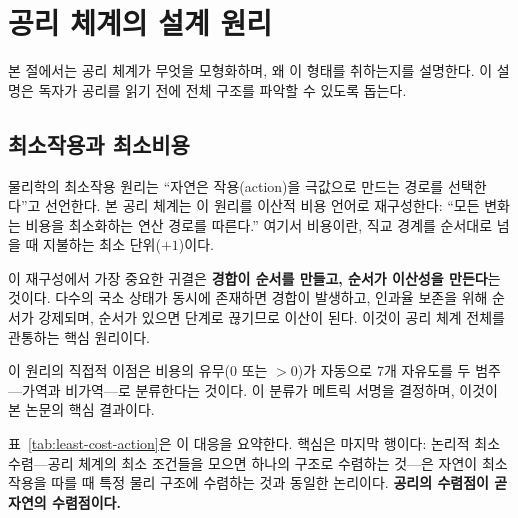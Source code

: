 \documentclass[entropy,article,submit,pdftex,oneauthor]{Definitions/mdpi}
\begin{document}
\section{공리 체계의 설계 원리}
\label{sec:framework}

본 절에서는 공리 체계가 무엇을 모형화하며, 왜 이 형태를 취하는지를 설명한다. 이 설명은 독자가 공리를 읽기 전에 전체 구조를 파악할 수 있도록 돕는다.

\subsection{최소작용과 최소비용}

물리학의 최소작용 원리는 ``자연은 작용(action)을 극값으로 만드는 경로를 선택한다''고 선언한다. 본 공리 체계는 이 원리를 이산적 비용 언어로 재구성한다: ``모든 변화는 비용을 최소화하는 연산 경로를 따른다.'' 여기서 비용이란, 직교 경계를 순서대로 넘을 때 지불하는 최소 단위($+1$)이다.

이 재구성에서 가장 중요한 귀결은 \textbf{경합이 순서를 만들고, 순서가 이산성을 만든다}는 것이다. 다수의 국소 상태가 동시에 존재하면 경합이 발생하고, 인과율 보존을 위해 순서가 강제되며, 순서가 있으면 단계로 끊기므로 이산이 된다. 이것이 공리 체계 전체를 관통하는 핵심 원리이다.

이 원리의 직접적 이점은 비용의 유무($0$ 또는 $>0$)가 자동으로 7개 자유도를 두 범주---가역과 비가역---로 분류한다는 것이다. 이 분류가 메트릭 서명을 결정하며, 이것이 본 논문의 핵심 결과이다.

표~\ref{tab:least-cost-action}은 이 대응을 요약한다. 핵심은 마지막 행이다: 논리적 최소 수렴---공리 체계의 최소 조건들을 모으면 하나의 구조로 수렴하는 것---은 자연이 최소 작용을 따를 때 특정 물리 구조에 수렴하는 것과 동일한 논리이다. \textbf{공리의 수렴점이 곧 자연의 수렴점이다.}
\end{document}
